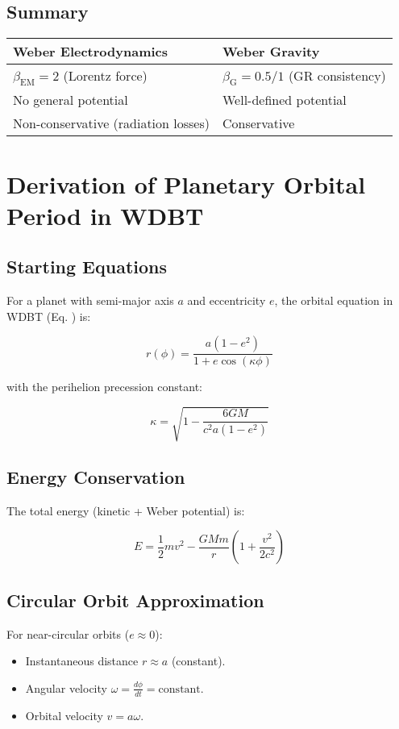 \subsection*{Summary}
\begin{tabular}{ll}
\textbf{Weber Electrodynamics} & \textbf{Weber Gravity} \\ \hline
$\beta_{\text{EM}} = 2$ (Lorentz force) & $\beta_{\text{G}} = 0.5/1$ (GR consistency) \\
No general potential & Well-defined potential \\
Non-conservative (radiation losses) & Conservative \\
\end{tabular}

\section{Derivation of Planetary Orbital Period in WDBT}
\label{sec:orbital_period}

\subsection*{Starting Equations}
For a planet with semi-major axis \( a \) and eccentricity \( e \), the orbital equation in WDBT (Eq. ) is:

\begin{equation}
r(\phi) = \frac{a(1-e^2)}{1 + e \cos(\kappa \phi)}
\end{equation}

with the perihelion precession constant:

\begin{equation}
\kappa = \sqrt{1 - \frac{6GM}{c^2 a(1-e^2)}}
\end{equation}

\subsection*{Energy Conservation}
The total energy (kinetic + Weber potential) is:

\begin{equation}
E = \frac{1}{2}mv^2 - \frac{GMm}{r}\left(1 + \frac{v^2}{2c^2}\right)
\end{equation}

\subsection*{Circular Orbit Approximation}
For near-circular orbits (\( e \approx 0 \)):
\begin{itemize}
\item Instantaneous distance \( r \approx a \) (constant).
\item Angular velocity \( \omega = \frac{d\phi}{dt} = \text{constant} \).
\item Orbital velocity \( v = a\omega \).
\end{itemize}

